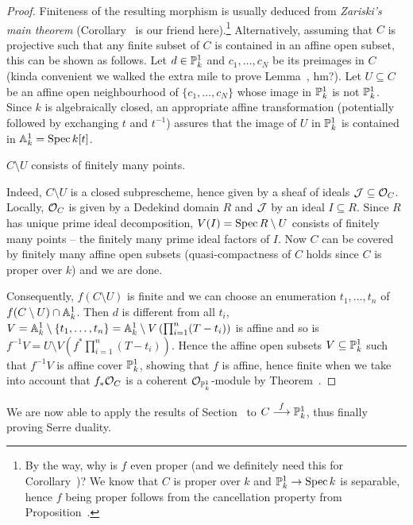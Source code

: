 \documentclass[a4paper,parskip=half,numbers=enddot, DIV=12]{scrreprt}
\begin{document}
\begin{proof}
	Finiteness of the resulting morphism is usually deduced from \emph{Zariski's main theorem} (Corollary~ is our friend here).\footnote{By the way, why is $f$ even proper (and we definitely need this for Corollary~)? We know that $C$ is proper over $k$ and $\IP_k^1\morphism \Spec k$ is separable, hence $f$ being proper follows from the cancellation property from Proposition~.} Alternatively, assuming that $C$ is projective such that any finite subset of $C$ is contained in an affine open subset, this can be shown as follows. Let $d\in\mathbb{P}_k^1$ and $c_1,\ldots,c_N$ be its preimages in $C$ (kinda convenient we walked the extra mile to prove Lemma~, hm?). Let $U\subseteq C$ be an affine open neighbourhood of $\{c_1,\ldots,c_N\}$ whose image in $\mathbb{P}_k^1$ is not $\mathbb{P}_k^1$. Since $k$ is algebraically closed, an appropriate affine transformation (potentially followed by exchanging $t$ and $t^{-1}$) assures that the image of $U$ in $\mathbb{P}_k^1$ is contained in $\mathbb{A}_k^1=\operatorname{Spec} k[t]$. 
	\begin{claim}
		$C\setminus U$ consists of finitely many points.
	\end{claim}
	Indeed, $C\setminus U$ is a closed subprescheme, hence given by a sheaf of ideals $\mathcal{J}\subseteq \mathcal{O}_C$. Locally, $\mathcal{O}_C$ is given by a Dedekind domain $R$ and $\mathcal{J}$ by an ideal $I\subseteq R$. Since $R$ has unique prime ideal decomposition, $V(I)=\operatorname{Spec} R\setminus U$ consists of finitely many points -- the finitely many prime ideal factors of $I$. Now $C$ can be covered by finitely many affine open subsets (quasi-compactness of $C$ holds since $C$ is proper over $k$) and we are done.
	
	Consequently, $f(C\setminus U)$ is finite and we can choose an enumeration $t_1,\ldots,t_n$ of $f(C\setminus U)\cap \mathbb{A}_k^1$. Then $d$ is different from all $t_i$, $V=\mathbb{A}_k^1\setminus\{t_1,\ldots,t_n\}=\mathbb{A}_k^1\setminus V\left(\prod_{i=1}^n(T-t_i)\right)$ is affine and so is $f^{-1}V=U\setminus V\left(f^*\prod_{i=1}^n(T-t_i)\right)$. Hence the affine open subsets $V\subseteq \mathbb{P}_k^1$ such that $f^{-1}V$ is affine cover $\mathbb{P}_k^1$, showing that $f$ is affine, hence finite when we take into account that $f_*\mathcal{O}_C$ is a coherent $\mathcal{O}_{\mathbb{P}_k^1}$-module by Theorem~.
\end{proof}
We are now able to apply the results of Section~ to $C\morphism[f]\IP_k^1$, thus finally proving Serre duality.
\end{document}
